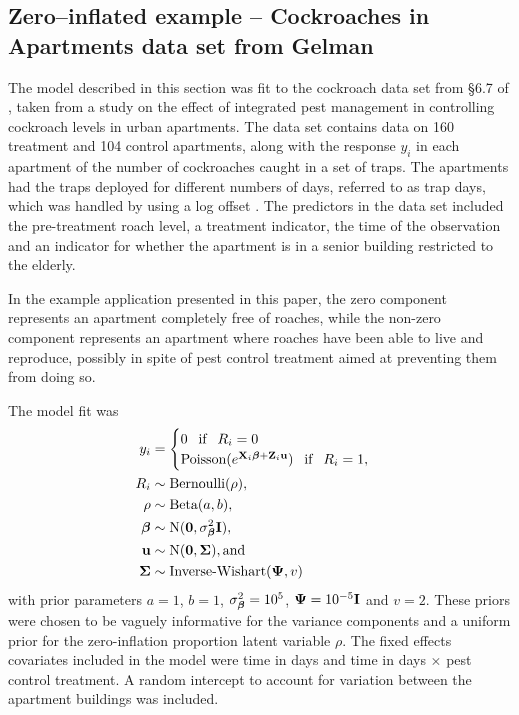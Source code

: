 			\subsection{Zero--inflated example -- Cockroaches in Apartments data set from Gelman}
			The model described in this section was fit
			 to the cockroach data set from \S 6.7 of \citep{Gelman2007}, taken from a study
			on the effect of integrated pest management in controlling cockroach levels in urban apartments. The data
			set contains data on 160 treatment and 104 control apartments, along with the response $y_i$ in each
			apartment of the number of cockroaches caught in a set of traps. The apartments had the traps deployed for
			different numbers of days, referred to as trap days, which was handled by using a log offset
			\citep{Agresti2002}. The predictors in the data set included the pre-treatment roach level, a treatment
			indicator, the time of the observation and an indicator for whether the apartment is in a senior building
			restricted to the elderly.
					
			In the example application presented in this paper, the zero component represents an apartment completely free of roaches, while the non-zero component represents an apartment where roaches have been able to live and reproduce, possibly in spite of pest control treatment aimed at preventing them from doing so.

			The model fit was
			\begin{align*}
				y_i &= \begin{cases}
				0 \phantom{-} \text{if} \phantom{-} R_i = 0 \\
				\text{Poisson}(e^{{\bf X}_i {\boldsymbol \beta} + {\bf Z}_i {\bf u}}) \phantom{-} \text{if} \phantom{-} R_i = 1,
				\end{cases} \\
				R_i &\sim \text{Bernoulli}(\rho), \\
				\rho &\sim \text{Beta}(a, b), \\
				{\boldsymbol \beta} &\sim \text{N}({\bf 0}, \sigma^2_{\boldsymbol \beta} {\bf I}), \\
				{\bf u} &\sim \text{N}({\bf 0}, {\boldsymbol \Sigma}), \text{and} \\
				{\boldsymbol \Sigma} &\sim \text{Inverse-Wishart}({\boldsymbol \Psi}, v)
			\end{align*}
			with prior parameters $a = 1$, $b = 1$, $\sigma^2_{\boldsymbol \beta} = 10^5$, ${\boldsymbol \Psi} = 10^{-5} {\bf I}$ and $v = 2$.
			These priors were chosen to be vaguely informative for the variance components and a uniform prior for
			the zero-inflation proportion latent variable $\rho$. The fixed effects covariates included in the
			model were time in days and time in days $\times$ pest control treatment. A random intercept to account
			for variation between the apartment buildings was included.
					

